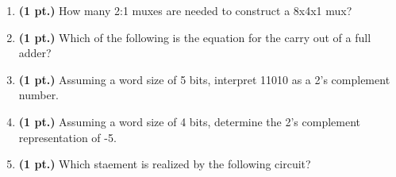 \documentclass{article}
\begin{document}
\begin{enumerate}
\item {\bf (1 pt.)} How many 2:1 muxes are needed to construct a 8x4x1 mux?

\item {\bf (1 pt.)} Which of the following is the equation for the carry
out of a full adder?

\item {\bf (1 pt.)} Assuming a word size of 5 bits, interpret 11010 as a 2's complement
number.

\item {\bf (1 pt.)} Assuming a word size of 4 bits, determine the 2's complement
representation of -5.

\pagebreak
\item {\bf (1 pt.)} Which staement is realized by the following circuit?



\end{enumerate}
\end{document}
